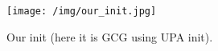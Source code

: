 \begin{figure}[H]
    \centering
    \texttt{[image: /img/our\_init.jpg]}
    \caption{Our init (here it is GCG using UPA init).}
    \label{fig:our_init}
\end{figure}